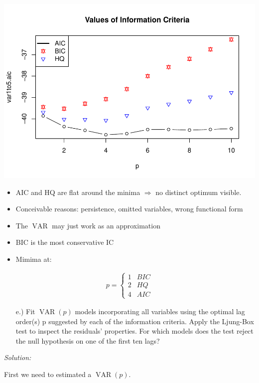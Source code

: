 \documentclass[12pt,a4paper]{article}
\newcommand{\VAR}{\operatorname{VAR}} %
\begin{document}
\includegraphics{solution_exercise_5_files/figure-latex/unnamed-chunk-8-1.pdf}

\begin{itemize}
  \item AIC and HQ are flat around the minima $\Rightarrow$ no distinct optimum visible. 
  \item Conceivable reasons: persistence, omitted variables,  wrong functional form
  \item The $\VAR$ may just work as an approximation
  \item BIC is the most conservative IC
  \item Mimima at:
\end{itemize}

\begin{align*}
p = 
  \begin{cases}
  1 & BIC \\
  2 & HQ \\
  4 & AIC
  \end{cases}
\end{align*}

\begin{itemize}
  \item[e.)] Fit $\VAR(p)$ models incorporating all variables using the optimal lag order(s) p suggested by each of the information criteria. Apply the Ljung-Box test to inspect the residuals’ properties. For which models does the test reject the null hypothesis on one of the first ten lags?
\end{itemize}

\emph{Solution:}

First we need to estimated a \(\VAR(p)\).
\end{document}
